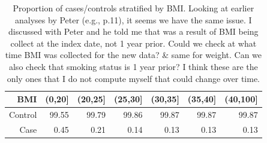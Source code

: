 \documentclass[12pt]{article}
\begin{document}
\clearpage
\begin{table}[h]
\centering
\begin{tabular}{rrrrrrr}
  \toprule
BMI & (0,20] & (20,25] & (25,30] & (30,35] & (35,40] & (40,100] \\ 
  \midrule
Control & 99.55 & 99.79 & 99.86 & 99.87 & 99.87 & 99.87 \\ 
  Case & 0.45 & 0.21 & 0.14 & 0.13 & 0.13 & 0.13 \\ 
   \bottomrule
\end{tabular}
\caption{Proportion of cases/controls stratified by BMI. Looking at earlier 
analyses by Peter (e.g., p.11), it seems we have the same issue. I discussed 
with Peter and he told me that was a result of BMI being collect at the index
date, not 1 year prior. Could we check at what time BMI was collected for the 
new data? \& same for weight. Can we also check that smoking status is 1 year
prior? I think these are the only ones that I do not compute myself that 
could change over time.}
\end{table}
\end{document}
